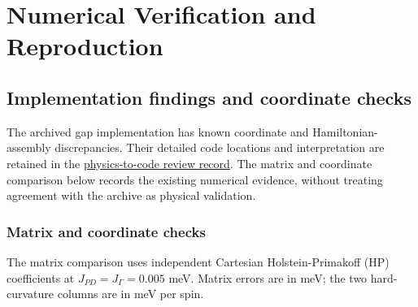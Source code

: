 \clearpage

\section{Numerical Verification and
Reproduction}\label{sec-nbcp-verification-appendix}

\subsection{Implementation findings and coordinate
checks}\label{sec-legacy}

The archived gap implementation has known coordinate and
Hamiltonian-assembly discrepancies. Their detailed code locations and
interpretation are retained in the
\href{../../../GOVERNMENT/Working-Pad/issue-notes/open/260918-nbcp-physics-code-review.md\#preserved-legacy-implementation-findings}{physics-to-code
review record}. The matrix and coordinate comparison below records the
existing numerical evidence, without treating agreement with the archive
as physical validation.

\subsubsection{Matrix and coordinate
checks}\label{matrix-and-coordinate-checks}

The matrix comparison uses independent Cartesian Holstein-Primakoff (HP)
coefficients at \(J_{PD}=J_\Gamma=0.005\) meV. Matrix errors are in meV;
the two hard-curvature columns are in meV per spin.

